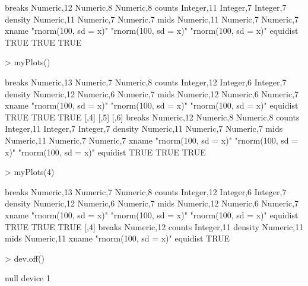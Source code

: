 \documentclass[12pt,letterpaper,final]{article}
\begin{document}
\begin{Schunk}
\begin{Soutput}
         [,4]                 [,5]                 [,6]                
breaks   Numeric,12           Numeric,8            Numeric,8           
counts   Integer,11           Integer,7            Integer,7           
density  Numeric,11           Numeric,7            Numeric,7           
mids     Numeric,11           Numeric,7            Numeric,7           
xname    "rnorm(100, sd = x)" "rnorm(100, sd = x)" "rnorm(100, sd = x)"
equidist TRUE                 TRUE                 TRUE                
\end{Soutput}
\begin{Sinput}
> myPlots()
\end{Sinput}
\begin{Soutput}
         [,1]                 [,2]                 [,3]                
breaks   Numeric,13           Numeric,7            Numeric,8           
counts   Integer,12           Integer,6            Integer,7           
density  Numeric,12           Numeric,6            Numeric,7           
mids     Numeric,12           Numeric,6            Numeric,7           
xname    "rnorm(100, sd = x)" "rnorm(100, sd = x)" "rnorm(100, sd = x)"
equidist TRUE                 TRUE                 TRUE                
         [,4]                 [,5]                 [,6]                
breaks   Numeric,12           Numeric,8            Numeric,8           
counts   Integer,11           Integer,7            Integer,7           
density  Numeric,11           Numeric,7            Numeric,7           
mids     Numeric,11           Numeric,7            Numeric,7           
xname    "rnorm(100, sd = x)" "rnorm(100, sd = x)" "rnorm(100, sd = x)"
equidist TRUE                 TRUE                 TRUE                
\end{Soutput}
\begin{Sinput}
> myPlots(4)
\end{Sinput}
\begin{Soutput}
         [,1]                 [,2]                 [,3]                
breaks   Numeric,13           Numeric,7            Numeric,8           
counts   Integer,12           Integer,6            Integer,7           
density  Numeric,12           Numeric,6            Numeric,7           
mids     Numeric,12           Numeric,6            Numeric,7           
xname    "rnorm(100, sd = x)" "rnorm(100, sd = x)" "rnorm(100, sd = x)"
equidist TRUE                 TRUE                 TRUE                
         [,4]                
breaks   Numeric,12          
counts   Integer,11          
density  Numeric,11          
mids     Numeric,11          
xname    "rnorm(100, sd = x)"
equidist TRUE                
\end{Soutput}
\begin{Sinput}
> dev.off()
\end{Sinput}
\begin{Soutput}
null device 
          1 
\end{Soutput}
\end{Schunk}
\end{document}
